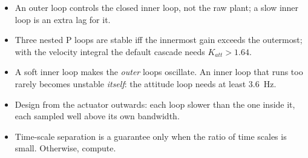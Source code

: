 \begin{remember}
\begin{itemize}
  \item An outer loop controls the closed inner loop, not the raw plant; a slow inner loop is an extra lag for it.
  \item Three nested P loops are stable iff the innermost gain exceeds the outermost; with the velocity integral the default cascade needs $K_{att} > 1.64$.
  \item A soft inner loop makes the \emph{outer} loops oscillate. An inner loop that runs too rarely becomes unstable \emph{itself}: the attitude loop needs at least \SI{3.6}{Hz}.
  \item Design from the actuator outwards: each loop slower than the one inside it, each sampled well above its own bandwidth.
  \item Time-scale separation is a guarantee only when the ratio of time scales is small. Otherwise, compute.
\end{itemize}
\end{remember}


